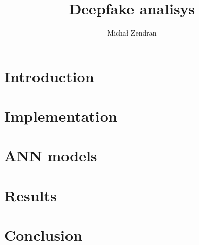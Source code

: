 \documentclass[12pt, en, oneside, openany, draft]{mgr}
\title{Deepfake analisys}
\author{Michał Zendran}
\begin{document}
\maketitle
\tableofcontents
\newpage

\chapter{Introduction}	


\chapter{Implementation}


\chapter{ANN models}

\chapter{Results}

\chapter{Conclusion}

\listoffigures
\listoftables
\end{document}
